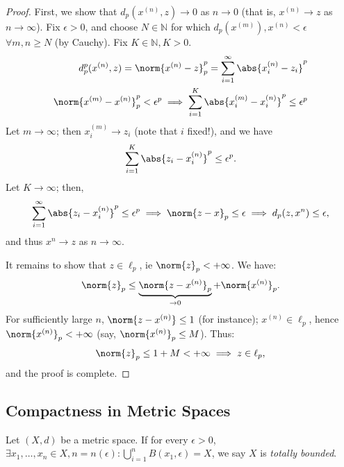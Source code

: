\begin{proof}
    First, we show that $d_p(x^{(n)}, z) \to 0$ as $n \to 0$ (that is, $x^{(n)} \to z$ as $n \to \infty$). Fix $\epsilon >0$, and choose $N \in \mathbb{N}$ for which $d_p(x^{(m)}), x^{(n)} < \epsilon$ $\forall m, n \geq N$ (by Cauchy). Fix $K \in \mathbb{N}, K > 0$.
    \begin{align*}
        d_p^p(x^{(n)}, z) = \norm{x^{(n)} - z}_p^p = \sum_{i=1}^\infty \abs{x_i^{(n)} - z_i}^{p}\\
        \norm{x^{(m)} - x^{(n)}}_p^p < \epsilon^p \implies \sum_{i=1}^K\abs{x_i^{(m)} - x_i^{(n)}}^p \leq \epsilon^p
    \end{align*}
    Let $m \to \infty$; then $x_i^{(m)} \to z_i$ (note that $i$ fixed!), and we have \begin{align*}
        \sum_{i=1}^K\abs{z_i - x_i^{(n)}}^p \leq \epsilon^p.
    \end{align*}
    Let $K \to \infty$; then, 
    \begin{align*}
        \sum_{i=1}^\infty \abs{z_i - x_i^{(n)}}^p \leq \epsilon^p\implies \norm{z - x}_p \leq \epsilon\implies d_p(z, x^{n}) \leq \epsilon,
    \end{align*}
    and thus $x^{n} \to z$ as $n \to \infty$. 

    It remains to show that $z \in \ell_p$, ie $\norm{z}_p < + \infty$. We have:
    \begin{align*}
        \norm{z}_p \leq \underbrace{\norm{z - x^{(n)}}_p}_{\to 0} + \norm{x^{(n)}}_p.
    \end{align*}
    For sufficiently large $n$, $\norm{z - x^{(n)}} \leq 1$ (for instance); $x^{(n)} \in \ell_p$, hence $\norm{x^{(n)}}_p < + \infty$ (say, $\norm{x^{(n)}}_p \leq M$). Thus:\begin{align*}
        \norm{z}_p \leq 1 + M < + \infty \implies z \in \ell_p,
    \end{align*}
    and the proof is complete.
\end{proof}

\subsection{Compactness in Metric Spaces}
\begin{definition}
    Let $(X,d)$ be a metric space. If for every $\epsilon > 0$, $\exists x_1, \dots, x_n \in X, n = n(\epsilon) : \bigcup_{i=1}^n B(x_1, \epsilon) = X$, we say $X$ is \emph{totally bounded}.
\end{definition}
